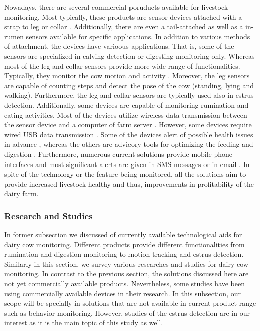 \documentclass[english,12pt,a4paper,pdftex,elec,utf8]{aaltothesis}
\begin{document}
Nowadays, there are several commercial poruducts available for livestock monitoring. Most typically, these products are sensor devices attached with a strap to leg \cite{iceroboticproductbrochure}\cite{geacowscout} or collar \cite{heatime}\cite{geacowscout}\cite{moocall}. Additionally, there are even a tail-attached \cite{moocall} as well as a in-rumen \cite{wellcowbolus} sensors available for specific applications. In addition to various methods of attachment, the devices have varioous applications. That is, some of the sensors are specialized in calving detection \cite{moocall} or digesting monitoring \cite{wellcowbolus} only. Whereas most of the leg and collar sensors provide more wide range of functionalities. Typically, they monitor the cow motion and activity \cite{iceroboticproductbrochure}\cite{heatime}\cite{geacowscout,}\cite{moocall}. Moreover, the leg sensors are capable of counting steps and detect the pose of the cow (standing, lying and walking). Furthermore, the leg and collar sensors are typically used also in estrus detection. Additionally, some devices are capable of monitoring rumination \cite{heatime} and eating \cite{geacowscout} activities. Most of the devices utilize wireless data transmission between the sensor device and a computer of farm server \cite{heatime} \cite{geacowscout} \cite{iceroboticproductbrochure} \cite{wellcowbolus}. However, some devices require wired USB data transmission \cite{iceroboticproductbrochure}. Some of the devices alert of possible health issues in advance \cite{heatime}\cite{geacowscout}\cite{iceroboticproductbrochure}, whereas the others are advicory tools for optimizing the feeding and digestion \cite{wellcowbolus}. Furthermore, numerous current solutions provide mobile phone interfaces and most significant alerts are given in SMS messages or in email \cite{heatime}. In spite of the technology or the feature being monitored, all the solutions aim to provide increased livestock healthy and thus, improvements in profitability of the dairy farm.


\subsubsection{Research and Studies} \label{researchandstudiessection}

In former subsection we discussed of currently available technological aids for dairy cow monitoring. Different products provide different functionalities from rumination and digestion monitoring to motion tracking and estrus detection. Similarly in this section, we survey various researches and studies for dairy cow monitoring. In contrast to the previous section, the solutions discussed here are not yet commercially available products. Nevertheless, some studies have been using commercially available devices in their research. In this subsection, our scope will be specially in solutions that are not available in current product range such as behavior monitoring. However, studies of the estrus detection are in our interest as it is the main topic of this study as well. 
\end{document}
